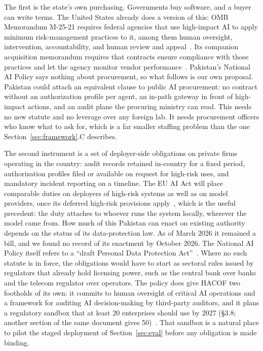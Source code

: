 \documentclass[journal]{IEEEtran}
\newcommand{\hacof}{HACOF}
\begin{document}
The first is the state's own purchasing. Governments buy software, and a buyer can write terms. The United States already does a version of this: OMB Memorandum M-25-21 requires federal agencies that use high-impact AI to apply minimum risk-management practices to it, among them human oversight, intervention, accountability, and human review and appeal~\cite{omb2025m2521}.
Its companion acquisition memorandum requires that contracts ensure compliance with those practices and let the agency monitor vendor performance~\cite{omb2025m2522}.
Pakistan's National AI Policy says nothing about procurement, so what follows is our own proposal. Pakistan could attach an equivalent clause to public AI procurement: no contract without an authorization profile per agent, an in-path gateway in front of high-impact actions, and an audit plane the procuring ministry can read. This needs no new statute and no leverage over any foreign lab. It needs procurement officers who know what to ask for, which is a far smaller staffing problem than the one Section~\ref{sec:framework}.C describes.

The second instrument is a set of deployer-side obligations on private firms operating in the country: audit records retained in-country for a fixed period, authorization profiles filed or available on request for high-risk uses, and mandatory incident reporting on a timeline. The EU AI Act will place comparable duties on deployers of high-risk systems as well as on model providers, once its deferred high-risk provisions apply~\cite{euaiact2024,euaiomnibus2026},
which is the useful precedent: the duty attaches to whoever runs the system locally, wherever the model came from. How much of this Pakistan can enact on existing authority depends on the status of its data-protection law. As of March 2026 it remained a bill, and we found no record of its enactment by October 2026. The National AI Policy itself refers to a ``draft Personal Data Protection Act''~\cite{pakistan2025nationalaipolicy,chambers2026pakistandp}.
Where no such statute is in force, the obligations would have to start as sectoral rules issued by regulators that already hold licensing power, such as the central bank over banks and the telecom regulator over operators.
The policy does give \hacof{} two footholds of its own: it commits to human oversight of critical AI operations and a framework for auditing AI decision-making by third-party auditors, and it plans a regulatory sandbox that at least 20 enterprises should use by 2027 (\S3.8; another section of the same document gives 50)~\cite{pakistan2025nationalaipolicy}. That sandbox is a natural place to pilot the staged deployment of Section~\ref{sec:eval} before any obligation is made binding.
\end{document}
